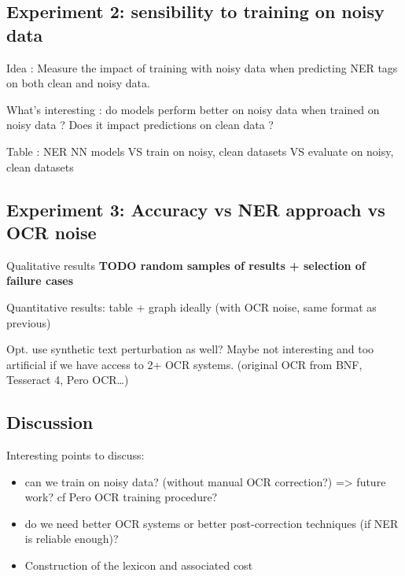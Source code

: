                                         

\subsection{Experiment 2: sensibility to training on noisy data}
Idea : Measure the impact of training with noisy data when predicting NER tags on both clean and noisy data.

What's interesting : do models perform better on noisy data when trained on noisy data ? Does it impact predictions on clean data ?

Table : NER NN models VS train on {noisy, clean} datasets VS evaluate on {noisy, clean} datasets


\subsection{Experiment 3: Accuracy vs NER approach vs OCR noise}

Qualitative results
\textbf{TODO random samples of results + selection of failure cases}

Quantitative results: table + graph ideally (with OCR noise, same format as previous)

Opt. use synthetic text perturbation as well? Maybe not interesting and too artificial if we have access to 2+ OCR systems.
(original OCR from BNF, Tesseract 4, Pero OCR…)


\subsection{Discussion}
Interesting points to discuss:
\begin{itemize}
    \item can we train on noisy data? (without manual OCR correction?) => future work? cf Pero OCR training procedure?
    \item do we need better OCR systems or better post-correction techniques (if NER is reliable enough)?
    \item Construction of the lexicon and associated cost
\end{itemize}
